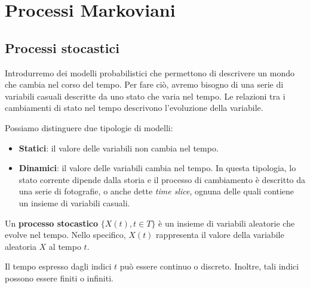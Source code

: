 \chapter{Processi Markoviani}
\section{Processi stocastici}
Introdurremo dei modelli probabilistici che permettono di descrivere un mondo
che cambia nel corso del tempo. Per fare ciò, avremo bisogno di una serie di
variabili casuali descritte da uno stato che varia nel tempo. Le relazioni tra i
cambiamenti di stato nel tempo descrivono l'evoluzione della variabile.

Possiamo distinguere due tipologie di modelli:
\begin{itemize}
    \item \textbf{Statici}: il valore delle variabili non cambia nel tempo.
    \item \textbf{Dinamici}: il valore delle variabili cambia nel tempo. In questa
          tipologia, lo stato corrente dipende dalla storia e il processo di
          cambiamento è descritto da una serie di fotografie, o anche dette
          \textit{time slice}, ognuna delle quali contiene un insieme di variabili
          casuali.
\end{itemize}
\begin{definizione}
    Un \textbf{processo stocastico} $\{X(t), t\in T\}$ è un insieme di variabili
    aleatorie che evolve nel tempo. Nello specifico, $X(t)$ rappresenta il valore
    della variabile aleatoria $X$ al tempo $t$.
\end{definizione}
Il tempo espresso dagli indici $t$ può essere continuo o discreto. Inoltre, tali
indici possono essere finiti o infiniti.

